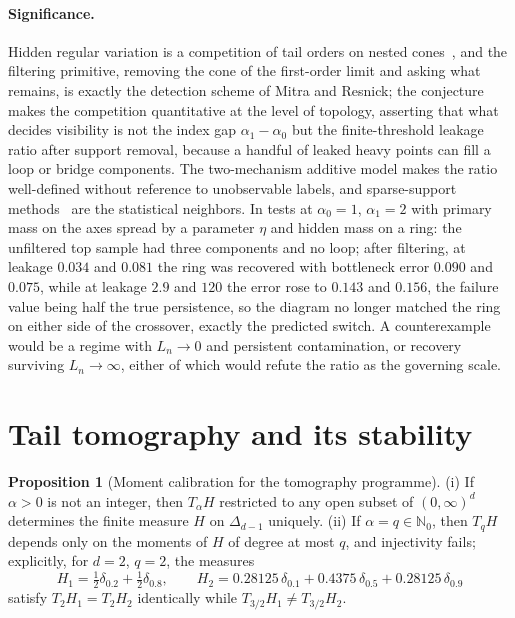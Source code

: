 \documentclass[11pt]{article}
\theoremstyle{definition}
\newtheorem{proposition}{Proposition}
\begin{document}
\paragraph{Significance.}
Hidden regular variation is a competition of tail orders on nested cones~\cite{Res08,MR11}, and the filtering primitive, removing the cone of the first-order limit and asking what remains, is exactly the detection scheme of Mitra and Resnick; the conjecture makes the competition quantitative at the level of topology, asserting that what decides visibility is not the index gap $\alpha_1-\alpha_0$ but the finite-threshold leakage ratio after support removal, because a handful of leaked heavy points can fill a loop or bridge components.  The two-mechanism additive model makes the ratio well-defined without reference to unobservable labels, and sparse-support methods~\cite{MW21} are the statistical neighbors.  In tests at $\alpha_0=1$, $\alpha_1=2$ with primary mass on the axes spread by a parameter $\eta$ and hidden mass on a ring: the unfiltered top sample had three components and no loop; after filtering, at leakage $0.034$ and $0.081$ the ring was recovered with bottleneck error $0.090$ and $0.075$, while at leakage $2.9$ and $120$ the error rose to $0.143$ and $0.156$, the failure value being half the true persistence, so the diagram no longer matched the ring on either side of the crossover, exactly the predicted switch.  A counterexample would be a regime with $L_n\to0$ and persistent contamination, or recovery surviving $L_n\to\infty$, either of which would refute the ratio as the governing scale.

\section{Tail tomography and its stability}

\begin{proposition}[Moment calibration for the tomography programme]\label{ah:moment}
(i) If $\alpha>0$ is not an integer, then $T_\alpha H$ restricted to any open subset of $(0,\infty)^d$ determines the finite measure $H$ on $\Delta_{d-1}$ uniquely.  (ii) If $\alpha=q\in\mathbb N_0$, then $T_qH$ depends only on the moments of $H$ of degree at most $q$, and injectivity fails; explicitly, for $d=2$, $q=2$, the measures
\[
H_1=\tfrac12\delta_{0.2}+\tfrac12\delta_{0.8},\qquad
H_2=0.28125\,\delta_{0.1}+0.4375\,\delta_{0.5}+0.28125\,\delta_{0.9}
\]
satisfy $T_2H_1=T_2H_2$ identically while $T_{3/2}H_1\ne T_{3/2}H_2$.
\end{proposition}
\end{document}
